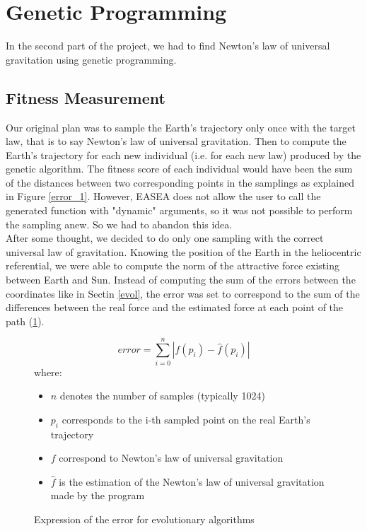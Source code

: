 \section{Genetic Programming}
In the second part of the project, we had to find Newton's law of universal
gravitation using genetic programming.

\subsection{Fitness Measurement}
Our original plan was to sample the Earth's trajectory only once with the
target law, that is to say Newton's law of universal gravitation. Then to
compute the Earth's trajectory for each new individual (i.e. for each new law)
produced by the genetic algorithm. The fitness score of each individual would
have been the sum of the distances between two corresponding points in the
samplings as explained in Figure \ref{error_1}. However, EASEA does not allow
the
user to call the generated function with
"dynamic" arguments, so it was not possible to perform the sampling anew. So we
had to abandon this idea.\\

After some thought, we decided to do only one sampling with the correct
universal law of gravitation. Knowing the position of the Earth in the
heliocentric referential, we were able to compute the norm of the attractive
force existing between Earth and Sun. Instead of computing the sum of the
errors between the coordinates like in Sectin \ref{evol}, the error was set to
correspond to the sum of the differences between the real force and the
estimated force at each point of the path (\Figure \ref{error_2}).\\

\begin{figure}
    \[ error = \sum_{i=0}^{n} | f(p_{i}) - \hat{f}(p_{i}) | \]
    where:
    \begin{itemize}
        \item \(n\) denotes the number of samples (typically 1024)
        \item \(p_{i}\) corresponds to the i-th sampled point on the real
              Earth's
              trajectory
        \item \(f\) correspond to Newton's law of universal gravitation
        \item \(\hat{f}\) is the estimation of the Newton's law of universal
              gravitation made by the program
    \end{itemize}
    \caption{Expression of the error for evolutionary algorithms}
    \label{error_2}
\end{figure}

